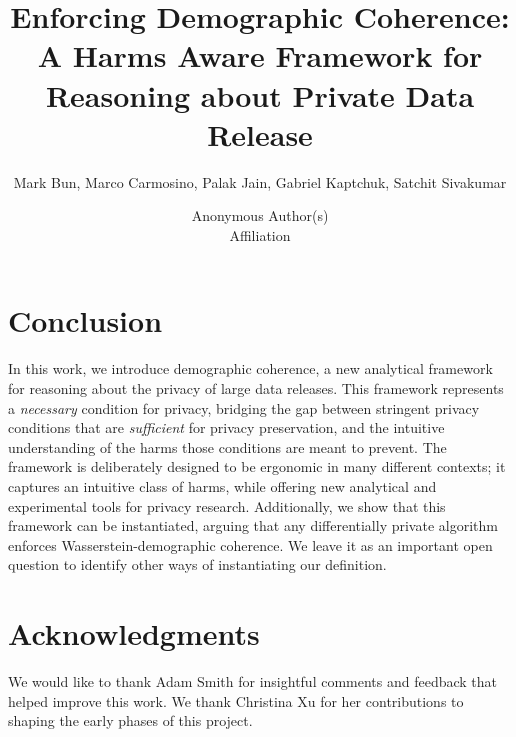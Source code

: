 \documentclass[12pt]{article}
\title{Enforcing Demographic Coherence: A Harms Aware Framework for Reasoning about Private Data Release}
\author{Mark Bun, Marco Carmosino, Palak Jain, Gabriel Kaptchuk, Satchit Sivakumar}
\author{
{\rm Anonymous Author(s)}\\
Affiliation
}
\date{ }
\begin{document}
\maketitle


% 

\ifnum{}
\newpage  
\tableofcontents
\newpage
\fi













\ifnum{}
\section{Conclusion}
In this work, we introduce demographic coherence, a new analytical framework for reasoning about the privacy of large data releases. This framework represents a \emph{necessary} condition for privacy, bridging the gap between stringent privacy conditions that are \emph{sufficient} for privacy preservation, and the intuitive understanding of the harms those conditions are meant to prevent. The framework is deliberately designed to be ergonomic in many different contexts; it captures an intuitive class of harms, while offering new analytical and experimental tools for privacy research. Additionally, we show that this framework can be instantiated, arguing that any differentially private algorithm enforces Wasserstein-demographic coherence. We leave it as an important open question to identify other ways of instantiating our definition.

\clearpage

\fi


\section{Acknowledgments}
We would like to thank Adam Smith for insightful comments and feedback that helped improve this work. We thank Christina Xu for her contributions to shaping the early phases of this project.


 

\newpage
\ifnum{}


\newpage
\fi
\appendix





\ifnum{}

\fi
\end{document}
